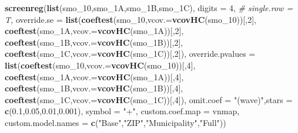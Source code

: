 \documentclass[
]{article}
\newenvironment{Shaded}{\begin{snugshade}}{\end{snugshade}}
\newcommand{\CommentTok}[1]{\textcolor[rgb]{0.56,0.35,0.01}{\textit{#1}}}
\newcommand{\DataTypeTok}[1]{\textcolor[rgb]{0.13,0.29,0.53}{#1}}
\newcommand{\DecValTok}[1]{\textcolor[rgb]{0.00,0.00,0.81}{#1}}
\newcommand{\FloatTok}[1]{\textcolor[rgb]{0.00,0.00,0.81}{#1}}
\newcommand{\KeywordTok}[1]{\textcolor[rgb]{0.13,0.29,0.53}{\textbf{#1}}}
\newcommand{\NormalTok}[1]{#1}
\newcommand{\StringTok}[1]{\textcolor[rgb]{0.31,0.60,0.02}{#1}}
\begin{document}
\begin{Shaded}
\begin{Highlighting}[]
\KeywordTok{screenreg}\NormalTok{(}\KeywordTok{list}\NormalTok{(smo_}\DecValTok{10}\NormalTok{,smo_1A,smo_1B,smo_1C), }\DataTypeTok{digits =} \DecValTok{4}\NormalTok{, }\CommentTok{# single.row = T,}
          \DataTypeTok{override.se =} \KeywordTok{list}\NormalTok{(}\KeywordTok{coeftest}\NormalTok{(smo_}\DecValTok{10}\NormalTok{,}\DataTypeTok{vcov.=}\KeywordTok{vcovHC}\NormalTok{(smo_}\DecValTok{10}\NormalTok{))[,}\DecValTok{2}\NormalTok{],}
                             \KeywordTok{coeftest}\NormalTok{(smo_1A,}\DataTypeTok{vcov.=}\KeywordTok{vcovHC}\NormalTok{(smo_1A))[,}\DecValTok{2}\NormalTok{],}
                             \KeywordTok{coeftest}\NormalTok{(smo_1B,}\DataTypeTok{vcov.=}\KeywordTok{vcovHC}\NormalTok{(smo_1B))[,}\DecValTok{2}\NormalTok{],}
                             \KeywordTok{coeftest}\NormalTok{(smo_1C,}\DataTypeTok{vcov.=}\KeywordTok{vcovHC}\NormalTok{(smo_1C))[,}\DecValTok{2}\NormalTok{]),}
          \DataTypeTok{override.pvalues =} \KeywordTok{list}\NormalTok{(}\KeywordTok{coeftest}\NormalTok{(smo_}\DecValTok{10}\NormalTok{,}\DataTypeTok{vcov.=}\KeywordTok{vcovHC}\NormalTok{(smo_}\DecValTok{10}\NormalTok{))[,}\DecValTok{4}\NormalTok{],}
                                  \KeywordTok{coeftest}\NormalTok{(smo_1A,}\DataTypeTok{vcov.=}\KeywordTok{vcovHC}\NormalTok{(smo_1A))[,}\DecValTok{4}\NormalTok{],}
                                  \KeywordTok{coeftest}\NormalTok{(smo_1B,}\DataTypeTok{vcov.=}\KeywordTok{vcovHC}\NormalTok{(smo_1B))[,}\DecValTok{4}\NormalTok{],}
                                  \KeywordTok{coeftest}\NormalTok{(smo_1C,}\DataTypeTok{vcov.=}\KeywordTok{vcovHC}\NormalTok{(smo_1C))[,}\DecValTok{4}\NormalTok{]),}
          \DataTypeTok{omit.coef =} \StringTok{"(wave)"}\NormalTok{,}\DataTypeTok{stars =} \KeywordTok{c}\NormalTok{(}\FloatTok{0.1}\NormalTok{,}\FloatTok{0.05}\NormalTok{,}\FloatTok{0.01}\NormalTok{,}\FloatTok{0.001}\NormalTok{), }\DataTypeTok{symbol =} \StringTok{"+"}\NormalTok{,}
          \DataTypeTok{custom.coef.map =}\NormalTok{ vnmap, }
          \DataTypeTok{custom.model.names =} \KeywordTok{c}\NormalTok{(}\StringTok{"Base"}\NormalTok{,}\StringTok{"ZIP"}\NormalTok{,}\StringTok{"Municipality"}\NormalTok{,}\StringTok{"Full"}\NormalTok{))}
\end{Highlighting}
\end{Shaded}
\end{document}
